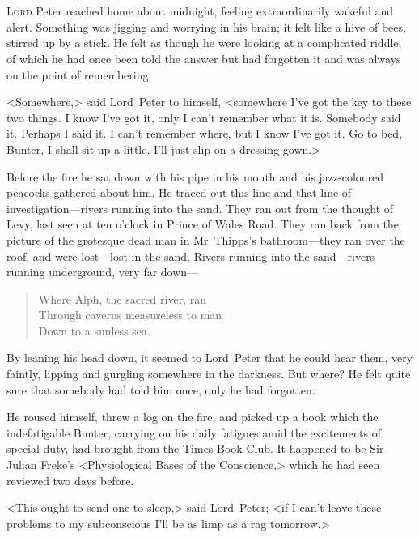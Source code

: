 \chapter[Chapter \thechapter]{}
\lettrine{L}{ord} Peter reached home about midnight, feeling extraordinarily wakeful and alert. Something was jigging and worrying in his brain; it felt like a hive of bees, stirred up by a stick. He felt as though he were looking at a complicated riddle, of which he had once been told the answer but had forgotten it and was always on the point of remembering.

<Somewhere,> said Lord~Peter to himself, <somewhere I've got the key to these two things. I know I've got it, only I can't remember what it is. Somebody said it. Perhaps I said it. I can't remember where, but I know I've got it. Go to bed, Bunter, I shall sit up a little. I'll just slip on a dressing-gown.>

Before the fire he sat down with his pipe in his mouth and his jazz-coloured peacocks gathered about him. He traced out this line and that line of investigation—rivers running into the sand. They ran out from the thought of Levy, last seen at ten o'clock in Prince of Wales Road. They ran back from the picture of the grotesque dead man in Mr~Thipps's bathroom—they ran over the roof, and were lost—lost in the sand. Rivers running into the sand—rivers running underground, very far down—

\begin{verse}
Where Alph, the sacred river, ran\\
Through caverns measureless to man\\
Down to a sunless sea.\\
\end{verse}


By leaning his head down, it seemed to Lord~Peter that he could hear them, very faintly, lipping and gurgling somewhere in the darkness. But where? He felt quite sure that somebody had told him once, only he had forgotten.

He roused himself, threw a log on the fire, and picked up a book which the indefatigable Bunter, carrying on his daily fatigues amid the excitements of special duty, had brought from the Times Book Club. It happened to be Sir Julian Freke's <Physiological Bases of the Conscience,> which he had seen reviewed two days before.

<This ought to send one to sleep,> said Lord~Peter; <if I can't leave these problems to my subconscious I'll be as limp as a rag tomorrow.>

